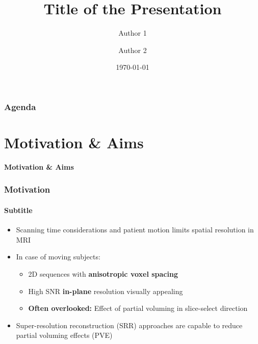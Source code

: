 \documentclass[compress,12pt,handout]{beamer} %
\title[Short Title]{Title of the Presentation}
\author[Auth. 1 \and Auth.2]{Author 1 \and Author 2}
\institute[UCL]{%
  Translational Imaging Group, CMIC\\%
  University College London
}
\date{\today}
\def\headline#1{\begin{frame}[c]\centering\color{headlinecolor}\LARGE\bfseries#1\end{frame}}
\begin{document}
\begin{frame}
  \titlepage
\end{frame}


\begin{frame}[t]\frametitle{Agenda}
   \tableofcontents%
\end{frame}



\section{Motivation \& Aims}
\headline{Motivation \& Aims}


\begin{frame}[t]\frametitle{Motivation}\framesubtitle{Subtitle}
    \begin{itemize}[<+->]\setlength{\itemsep}{12pt}
        \item Scanning time considerations and patient motion limits spatial resolution in MRI
        \item In case of moving subjects:
        \begin{itemize}
            \item 2D sequences with {\bf anisotropic voxel spacing}
            \item High SNR {\bf in-plane} resolution visually appealing
            \item \textbf{Often overlooked:} Effect of partial voluming in slice-select direction
        \end{itemize}
        \item Super-resolution reconstruction (SRR) approaches are capable to reduce partial voluming effects (PVE)
    \end{itemize}
\end{frame}
\end{document}

